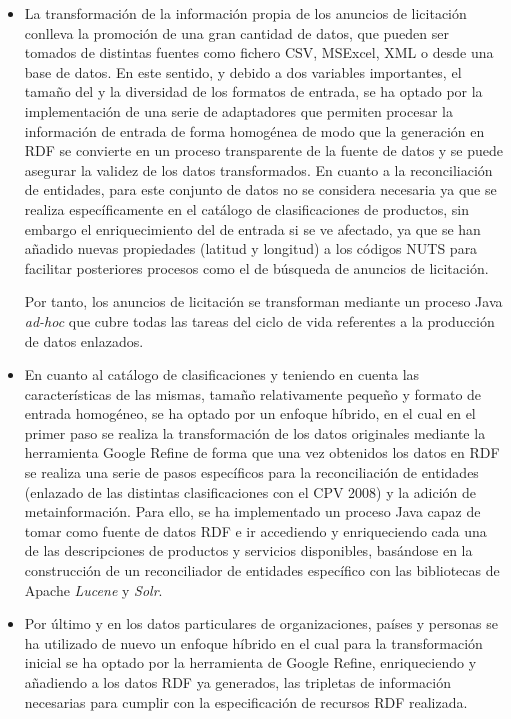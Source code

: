 \begin{itemize}
 \item La transformación de la información propia de los anuncios de licitación conlleva la promoción 
de una gran cantidad de datos, que pueden ser tomados de distintas fuentes 
como fichero \gls{CSV}, MSExcel, \gls{XML} o desde una base de datos. En este sentido, 
y debido a dos variables importantes, el tamaño del \dataset y la diversidad 
de los formatos de entrada, se ha optado por la implementación de una serie de adaptadores 
que permiten procesar la información de entrada de forma homogénea de modo que la generación 
en RDF se convierte en un proceso transparente de la fuente de datos y se puede asegurar 
la validez de los datos transformados. En cuanto a la reconciliación de entidades, para este 
conjunto de datos no se considera necesaria ya que se realiza específicamente en el catálogo 
de clasificaciones de productos, sin embargo el enriquecimiento del \dataset de entrada si 
se ve afectado, ya que se han añadido nuevas propiedades (latitud y longitud) a los códigos NUTS para facilitar 
posteriores procesos como el de búsqueda de anuncios de licitación. 

Por tanto, los anuncios de licitación se transforman mediante un proceso Java \textit{ad-hoc} que cubre 
todas las tareas del ciclo de vida referentes a la producción de datos enlazados.

\item En cuanto al catálogo de clasificaciones y teniendo en cuenta las características de las mismas, 
tamaño relativamente pequeño y formato de entrada homogéneo, se ha optado por un enfoque híbrido, en el cual 
en el primer paso se realiza la transformación de los datos originales mediante la herramienta Google 
Refine de forma que una vez obtenidos los datos en RDF se realiza una serie de pasos específicos para la 
reconciliación de entidades (enlazado de las distintas clasificaciones con el CPV 2008) y la adición 
de metainformación. Para ello, se ha implementado un proceso Java capaz de tomar como fuente de datos 
RDF e ir accediendo y enriqueciendo cada una de las descripciones de productos y servicios disponibles, 
basándose en la construcción de un reconciliador de entidades específico con las bibliotecas de 
Apache \textit{Lucene} y \textit{Solr}.


\item Por último y en los datos particulares de organizaciones, países y personas se ha utilizado 
de nuevo un enfoque híbrido en el cual para la transformación inicial se ha optado por la herramienta 
de Google Refine, enriqueciendo y añadiendo a los datos RDF ya generados, las tripletas de información 
necesarias para cumplir con la especificación de recursos RDF realizada.

\end{itemize}

